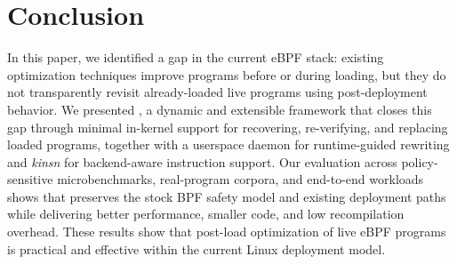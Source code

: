 


\section{Conclusion}
\label{sec:conclusion}

In this paper, we identified a gap in the current eBPF stack: existing optimization techniques improve programs before or during loading, but they do not transparently revisit already-loaded live programs using post-deployment behavior. We presented \tool, a dynamic and extensible framework that closes this gap through minimal in-kernel support for recovering, re-verifying, and replacing loaded programs, together with a userspace daemon for runtime-guided rewriting and \emph{kinsn} for backend-aware instruction support. Our evaluation across policy-sensitive microbenchmarks, real-program corpora, and end-to-end workloads shows that \tool preserves the stock BPF safety model and existing deployment paths while delivering better performance, smaller code, and low recompilation overhead. These results show that post-load optimization of live eBPF programs is practical and effective within the current Linux deployment model.